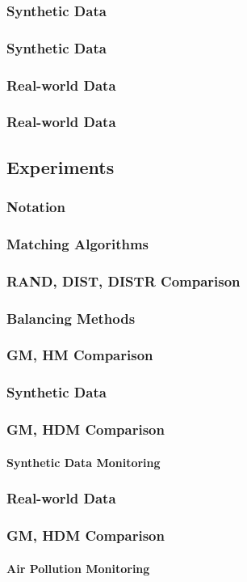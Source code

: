 \documentclass[hyperref={pdfpagelabels=false}]{beamer}
\begin{document}
\subsubsection*{Synthetic Data}
\begin{frame} \frametitle{Synthetic Data}

\end{frame}
\subsubsection*{Real-world Data}
\begin{frame} \frametitle{Real-world Data}

\end{frame}
\subsection{Experiments}
\begin{frame} \frametitle{Notation}

\end{frame}
\subsubsection*{ Matching Algorithms}
\begin{frame} \frametitle{RAND, DIST, DISTR Comparison}

\end{frame}
\subsubsection*{Balancing Methods}
\begin{frame} \frametitle{GM, HM Comparison}

\end{frame}
\subsubsection*{Synthetic Data}
\begin{frame} \frametitle{GM, HDM Comparison}\framesubtitle{Synthetic Data Monitoring}

\end{frame}
\subsubsection*{Real-world Data}
\begin{frame} \frametitle{GM, HDM Comparison}\framesubtitle{Air Pollution Monitoring}

\end{frame}
\end{document}
